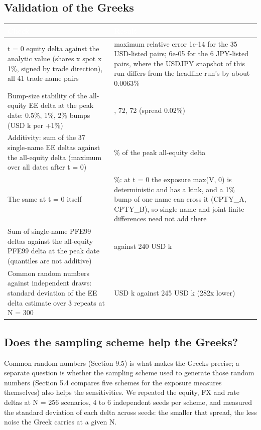 \documentclass[11pt,letterpaper]{article}
\begin{document}
\subsection{Validation of the Greeks}
{\scriptsize\setlength{\LTpre}{4pt}\setlength{\LTpost}{6pt}
\begin{longtable}{>{\raggedright\arraybackslash}p{}>{\raggedright\arraybackslash}p{}}
\toprule
\rowcolor{navy}\textbf{\textcolor{white}{Check}} & \textbf{\textcolor{white}{Result}} \\
\endhead
t = 0 equity delta against the analytic value (shares x spot x 1\%, signed by trade direction), all 41 trade-name pairs & maximum relative error 1e-14 for the 35 USD-listed pairs; 6e-05 for the 6 JPY-listed pairs, where the USDJPY snapshot of this run differs from the headline run's by about 0.0063\% \\
\rowcolor{gray!9}Bump-size stability of the all-equity EE delta at the peak date: 0.5\%, 1\%, 2\% bumps (USD k per +1\%) & 72, 72, 72 (spread 0.02\%) \\
Additivity: sum of the 37 single-name EE deltas against the all-equity delta (maximum over all dates after t = 0) & 0.06\% of the peak all-equity delta \\
\rowcolor{gray!9}The same at t = 0 itself & 0\%: at t = 0 the exposure max(V, 0) is deterministic and has a kink, and a 1\% bump of one name can cross it (CPTY\_A, CPTY\_B), so single-name and joint finite differences need not add there \\
Sum of single-name PFE99 deltas against the all-equity PFE99 delta at the peak date (quantiles are not additive) & 240 against 240 USD k \\
\rowcolor{gray!9}Common random numbers against independent draws: standard deviation of the EE delta estimate over 3 repeats at N = 300 & 1 USD k against 245 USD k (282x lower) \\
\bottomrule
\end{longtable}}

\subsection{Does the sampling scheme help the Greeks?}
Common random numbers (Section 9.5) is what makes the Greeks precise; a separate question is whether the sampling scheme used to generate those random numbers (Section 5.4 compares five schemes for the exposure measures themselves) also helps the sensitivities. We repeated the equity, FX and rate deltas at N = 256 scenarios, 4 to 6 independent seeds per scheme, and measured the standard deviation of each delta across seeds: the smaller that spread, the less noise the Greek carries at a given N.
\end{document}
